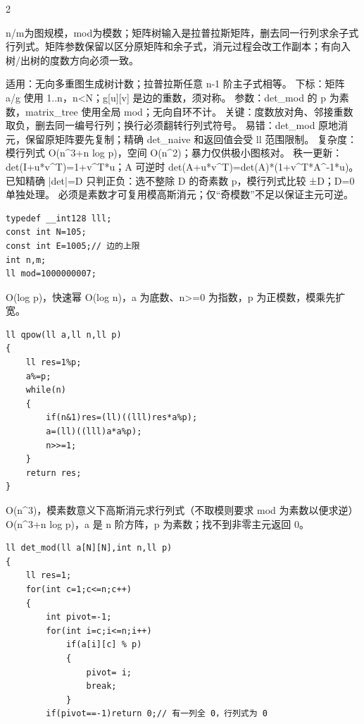 \documentclass[UTF8,fontset=fandol,a4paper,twoside]{ctexart}
\newcommand{\note}[1]{{\fontsize{10}{12}\selectfont #1\par}}
\begin{document}
\begin{multicols}{2}
\note{n/\allowbreak{}m为图规模，mod为模数；矩阵树输入是拉普拉斯矩阵，删去同一行列求余子式行列式。矩阵参数保留以区分原矩阵和余子式，消元过程会改工作副本；有向入树/\allowbreak{}出树的度数方向必须一致。}
\note{适用：无向多重图生成树计数；拉普拉斯任意 n-\allowbreak{}1 阶主子式相等。 下标：矩阵 a/\allowbreak{}g 使用 1.\allowbreak{}.\allowbreak{}n，n<\allowbreak{}N；g[\allowbreak{}u]\allowbreak{}[\allowbreak{}v]\allowbreak{} 是边的重数，须对称。 参数：det\_mod 的 p 为素数，matrix\_tree 使用全局 mod；无向自环不计。 关键：度数放对角、邻接重数取负，删去同一编号行列；换行必须翻转行列式符号。 易错：det\_mod 原地消元，保留原矩阵要先复制；精确 det\_naive 和返回值会受 ll 范围限制。 复杂度：模行列式 O(\allowbreak{}n\textasciicircum{}3+\allowbreak{}n log p)\allowbreak{}，空间 O(\allowbreak{}n\textasciicircum{}2)\allowbreak{}；暴力仅供极小图核对。 秩一更新：det(\allowbreak{}I+\allowbreak{}u*v\textasciicircum{}T)\allowbreak{}=\allowbreak{}1+\allowbreak{}v\textasciicircum{}T*u；A 可逆时 det(\allowbreak{}A+\allowbreak{}u*v\textasciicircum{}T)\allowbreak{}=\allowbreak{}det(\allowbreak{}A)\allowbreak{}*(\allowbreak{}1+\allowbreak{}v\textasciicircum{}T*A\textasciicircum{}-\allowbreak{}1*u)\allowbreak{}。 已知精确 |det|=\allowbreak{}D 只判正负：选不整除 D 的奇素数 p，模行列式比较 ±D；D=\allowbreak{}0 单独处理。 必须是素数才可复用模高斯消元；仅“奇模数”不足以保证主元可逆。}
\begin{lstlisting}
typedef __int128 lll;
const int N=105;
const int E=1005;// 边的上限
int n,m;
ll mod=1000000007;
\end{lstlisting}
\note{O(\allowbreak{}log p)\allowbreak{}，快速幂 O(\allowbreak{}log n)\allowbreak{}，a 为底数、n>\allowbreak{}=\allowbreak{}0 为指数，p 为正模数，模乘先扩宽。}
\begin{lstlisting}
ll qpow(ll a,ll n,ll p)
{
    ll res=1%p;
    a%=p;
    while(n)
    {
        if(n&1)res=(ll)((lll)res*a%p);
        a=(ll)((lll)a*a%p);
        n>>=1;
    }
    return res;
}
\end{lstlisting}
\note{O(\allowbreak{}n\textasciicircum{}3)\allowbreak{}，模素数意义下高斯消元求行列式（不取模则要求 mod 为素数以便求逆） O(\allowbreak{}n\textasciicircum{}3+\allowbreak{}n log p)\allowbreak{}，a 是 n 阶方阵，p 为素数；找不到非零主元返回 0。}
\begin{lstlisting}
ll det_mod(ll a[N][N],int n,ll p)
{
    ll res=1;
    for(int c=1;c<=n;c++)
    {
        int pivot=-1;
        for(int i=c;i<=n;i++)
            if(a[i][c] % p)
            {
                pivot= i;
                break;
            }
        if(pivot==-1)return 0;// 有一列全 0，行列式为 0

\end{lstlisting}
\end{multicols}
\end{document}
